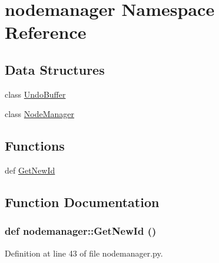 \hypertarget{namespacenodemanager}{
\section{nodemanager Namespace Reference}
\label{namespacenodemanager}
}


\subsection*{Data Structures}
\begin{CompactItemize}
\item 
class \hyperlink{classnodemanager_1_1UndoBuffer}{Undo\-Buffer}
\item 
class \hyperlink{classnodemanager_1_1NodeManager}{Node\-Manager}
\end{CompactItemize}
\subsection*{Functions}
\begin{CompactItemize}
\item 
def \hyperlink{namespacenodemanager_ea588f8d36eff932dcf6faf78a9ddf1d}{Get\-New\-Id}
\end{CompactItemize}


\subsection{Function Documentation}
\hypertarget{namespacenodemanager_ea588f8d36eff932dcf6faf78a9ddf1d}{
\subsubsection[GetNewId]{\setlength{\rightskip}{0pt plus 5cm}def nodemanager::Get\-New\-Id ()}}
\label{namespacenodemanager_ea588f8d36eff932dcf6faf78a9ddf1d}




Definition at line 43 of file nodemanager.py.